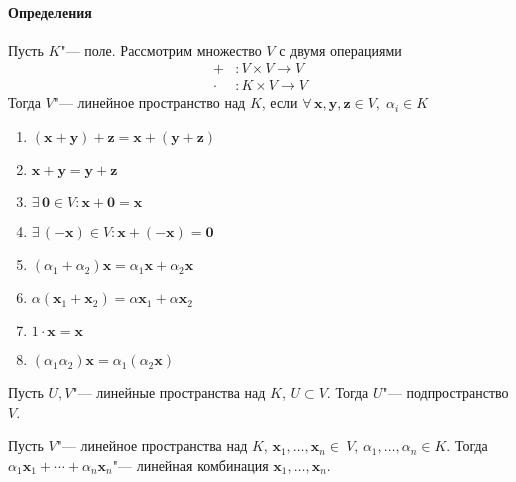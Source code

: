 \documentclass[12pt]{../../../notes}
\begin{document}
\setcounter{paragraph}{0}
\paragraph{Определения}
\begin{defn}\label{defn:linspace}
  Пусть $K$"--- поле. Рассмотрим множество  $V$ с двумя операциями
  \begin{align*}  
    + &: V \times V \to V \\
    \cdot &: K\times V \to V
  \end{align*}
  Тогда $V$"--- линейное пространство над $K$, если 
  $\forall\, \mathbf{x},\mathbf{y},\mathbf{z}\in V,\; \alpha_i \in K$
  \begin{enumerate}
    \item $(\mathbf{x}+\mathbf{y}) + \mathbf{z} = \mathbf{x} + (\mathbf{y}+\mathbf{z})$
    \item $\mathbf{x} + \mathbf{y} = \mathbf{y} + \mathbf{z} $
    \item $\exists\, \mathbf{0}\in V : \mathbf{x} + \mathbf{0} = \mathbf{x}$
    \item $\exists\, (-\mathbf{x})\in V : \mathbf{x} + (-\mathbf{x}) = \mathbf{0}$
    \item $(\alpha_1+\alpha_2) \mathbf{x} = \alpha_1 \mathbf{x} + \alpha_2 \mathbf{x}$
    \item $\alpha (\mathbf{x}_1 + \mathbf{x}_2) = \alpha \mathbf{x}_1 + \alpha \mathbf{x}_2$
    \item $1 \cdot \mathbf{x} = \mathbf{x}$
    \item $(\alpha_1 \alpha_2) \mathbf{x} = \alpha_1 (\alpha_2 \mathbf{x})$
  \end{enumerate}
\end{defn}

{ \label{defn:linsubspace}
  Пусть $U,V$"--- линейные пространства над $K$, $U \subset V$. Тогда $U$"--- подпространство 
  $V$.
}

{ \label{defn:lincomb}
Пусть $V$"--- линейное пространства над $K$, $\mathbf{x}_1, \dotsc, \mathbf{x}_n\in~V$, 
$\alpha_1, \dotsc, \alpha_n \in K$. Тогда $\alpha_1 \mathbf{x}_1 + \dotsb + \alpha_n \mathbf{x}_n$"--- 
линейная комбинация $\mathbf{x}_1, \dotsc, \mathbf{x}_n$.
}
\end{document}
